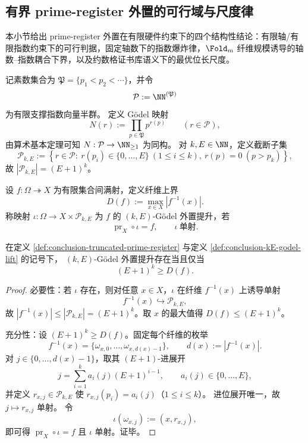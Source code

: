 \subsection{有界 prime-register 外置的可行域与尺度律}\label{subsec:conclusion-bounded-prime-register-godel-scaling}
本小节给出 prime-register 外置在有限硬件约束下的四个结构性结论：有限轴/有限指数约束下的可行判据，固定轴数下的指数爆炸律，\(\Fold_m\) 纤维规模诱导的轴数--指数耦合下界，以及约数格证书库语义下的最优位长尺度。

\begin{definition}\label{def:conclusion-truncated-prime-register}
记素数集合为 \(\mathfrak P=\{p_1<p_2<\cdots\}\)，并令
\[
\mathcal P:=\NN^{(\mathfrak P)}
\]
为有限支撑指数向量半群。
定义 Gödel 映射
\[
N(r):=\prod_{p\in\mathfrak P} p^{r(p)}\qquad (r\in\mathcal P),
\]
由算术基本定理可知 \(N:\mathcal P\to\NN_{\ge 1}\) 为同构。
对 \(k,E\in\NN\)，定义截断子集
\[
\mathcal P_{k,E}
:=\left\{
r\in\mathcal P:\ r(p_i)\in\{0,\dots,E\}\ (1\le i\le k),\ r(p)=0\ (p>p_k)
\right\},
\]
故 \(|\mathcal P_{k,E}|=(E+1)^k\)。
\end{definition}

\begin{definition}\label{def:conclusion-kE-godel-lift}
设 \(f:\Omega\twoheadrightarrow X\) 为有限集合间满射，定义纤维上界
\[
D(f):=\max_{x\in X}|f^{-1}(x)|.
\]
称映射 \(\iota:\Omega\to X\times\mathcal P_{k,E}\) 为 \(f\) 的 \((k,E)\)-Gödel 外置提升，若
\[
\operatorname{pr}_X\circ\iota=f,\qquad \iota\ \text{单射}.
\]
\end{definition}

\begin{theorem}\label{thm:conclusion-bounded-prime-register-feasibility}
在定义 \ref{def:conclusion-truncated-prime-register} 与定义 \ref{def:conclusion-kE-godel-lift} 的记号下，
\((k,E)\)-Gödel 外置提升存在当且仅当
\[
(E+1)^k\ge D(f).
\]
\end{theorem}
\begin{proof}
必要性：若 \(\iota\) 存在，则对任意 \(x\in X\)，\(\iota\) 在纤维 \(f^{-1}(x)\) 上诱导单射
\[
f^{-1}(x)\hookrightarrow \mathcal P_{k,E},
\]
故 \(|f^{-1}(x)|\le |\mathcal P_{k,E}|=(E+1)^k\)。取 \(x\) 的最大值得 \(D(f)\le (E+1)^k\)。

充分性：设 \((E+1)^k\ge D(f)\)。固定每个纤维的枚举
\[
f^{-1}(x)=\{\omega_{x,0},\dots,\omega_{x,d(x)-1}\},\qquad d(x):=|f^{-1}(x)|.
\]
对 \(j\in\{0,\dots,d(x)-1\}\)，取其 \((E+1)\)-进展开
\[
j=\sum_{i=1}^{k} a_i(j)(E+1)^{i-1},\qquad a_i(j)\in\{0,\dots,E\},
\]
并定义 \(r_{x,j}\in\mathcal P_{k,E}\) 使 \(r_{x,j}(p_i)=a_i(j)\)（\(1\le i\le k\)）。
进位展开唯一，故 \(j\mapsto r_{x,j}\) 单射。
令
\[
\iota(\omega_{x,j}):=(x,r_{x,j}),
\]
即可得 \(\operatorname{pr}_X\circ\iota=f\) 且 \(\iota\) 单射。证毕。
\end{proof}

